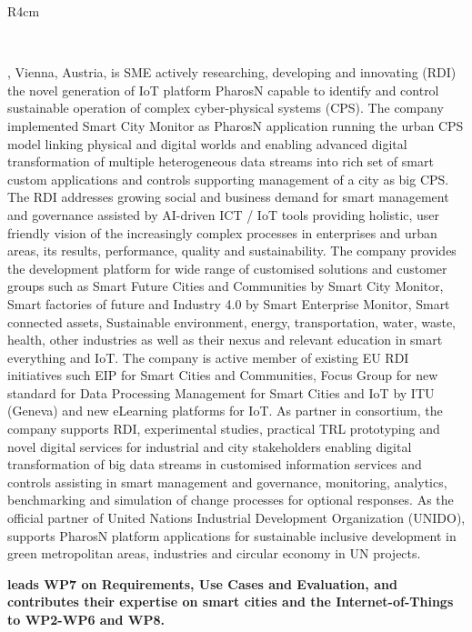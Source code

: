 \documentclass[a4paper,11pt]{article}
\begin{document}
\begin{wrapfigure}{R}{4cm}
\vspace{-2cm}
\hfill {}
\vspace{-1cm}
\end{wrapfigure}

\ 

\GOLEMlong, Vienna, Austria, is SME actively researching, developing and
innovating (RDI) the novel generation of IoT platform PharosN capable to
identify and control sustainable operation of complex cyber-physical
systems (CPS). The company implemented Smart City Monitor as PharosN
application running the urban CPS model linking physical and digital
worlds and enabling advanced digital transformation of multiple
heterogeneous data streams into rich set of smart custom applications and
controls supporting management of a city as big CPS. The RDI addresses
growing social and business demand for smart management and governance
assisted by AI-driven ICT / IoT tools providing holistic, user friendly
vision of the increasingly complex processes in enterprises and urban
areas, its results, performance, quality and sustainability. The company
provides the development platform for wide range of customised solutions
and customer groups such as Smart Future Cities and Communities by Smart
City Monitor, Smart factories of future and Industry 4.0 by Smart
Enterprise Monitor, Smart connected assets, Sustainable environment,
energy, transportation, water, waste, health, other industries as well as
their nexus and relevant education in smart everything and IoT.  The
company is active member of existing EU RDI initiatives such EIP for
Smart Cities and Communities, Focus Group for new standard for Data
Processing Management for Smart Cities and IoT by ITU (Geneva) and new
eLearning platforms for IoT. As partner in consortium, the company
supports RDI, experimental studies, practical TRL prototyping and novel
digital services for industrial and city stakeholders enabling digital
transformation of big data streams in customised information services and
controls assisting in smart management and governance, monitoring,
analytics, benchmarking and simulation of change processes for optional
responses.  As the official partner of United Nations Industrial
Development Organization ({UNIDO}), \GOLEMshort{} supports PharosN platform
applications for sustainable inclusive development in green metropolitan
areas, industries and circular economy in UN projects.

\vspace{10pt}
\textbf{\GOLEMshort{} leads WP7 on Requirements, Use Cases and Evaluation, and contributes their expertise on smart cities and the Internet-of-Things
to WP2-WP6 and WP8.}
\vspace{10pt}
\end{document}
